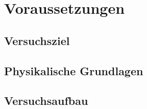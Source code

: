 \section{Voraussetzungen}

\subsection{Versuchsziel}

\subsection{Physikalische Grundlagen}

\subsection{Versuchsaufbau}